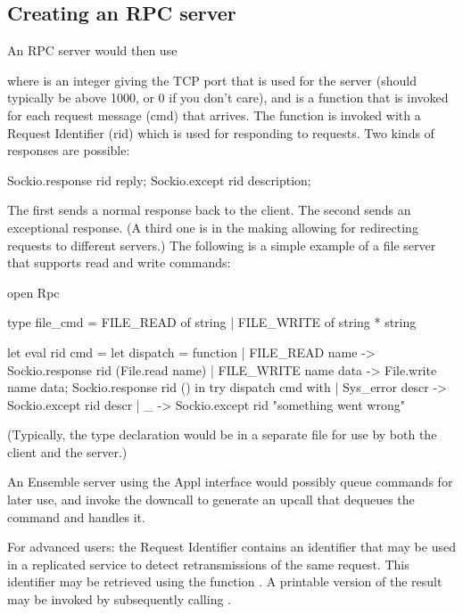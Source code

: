 \subsection{Creating an RPC server}

An RPC server would then use

where  is an integer giving the TCP port that is used for the server
(should typically be above 1000, or 0 if you don't care), and  is
a function that is invoked for each request message (cmd) that arrives.  The function
is invoked with a Request Identifier (rid) which is used for responding to requests.
Two kinds of responses are possible:
\begin{codebox}
  Sockio.response rid reply;
  Sockio.except rid description;
\end{codebox}

The first sends a normal response back to the client.  The second sends an
exceptional response.  (A third one is in the making allowing for redirecting
requests to different servers.)  The following is a simple example of a file server
that supports read and write commands:
\begin{codebox}
  open Rpc
  
  type file_cmd
    = FILE_READ of string
    | FILE_WRITE of string * string
  
  let eval rid cmd =
    let dispatch = function
      | FILE_READ name ->
          Sockio.response rid (File.read name)
      | FILE_WRITE name data ->
          File.write name data;
          Sockio.response rid ()
    in
    try
      dispatch cmd
    with
      | Sys_error descr ->
          Sockio.except rid descr
      | _ ->
          Sockio.except rid "something went wrong"
\end{codebox}
(Typically, the type declaration would be in a separate  file for use by
both the client and the server.)

An Ensemble server using the Appl interface would possibly queue commands for later
use, and invoke the  downcall to generate an upcall that dequeues the
command and handles it.

For advanced users: the Request Identifier contains an identifier that may be used in
a replicated service to detect retransmissions of the same request.  This identifier
may be retrieved using the function .  A printable version
of the result may be invoked by subsequently calling .

